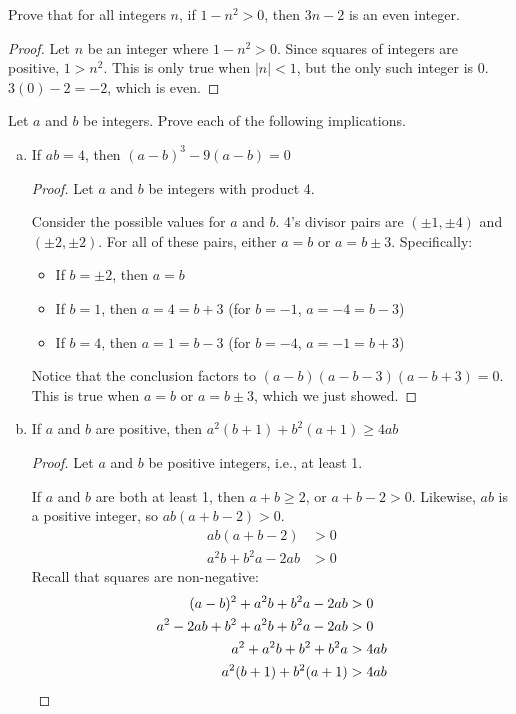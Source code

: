 \question Prove that for all integers $n$, if $1-n^2 > 0$, then $3n - 2$ is an even integer.
\begin{proof}
  Let $n$ be an integer where $1-n^2 > 0$.
  Since squares of integers are positive, $1 > n^2$.
  This is only true when $|n| < 1$, but the only such integer is 0.
  $3(0)-2=-2$, which is even.
\end{proof}


\question Let $a$ and $b$ be integers. Prove each of the following implications.
\begin{enumerate}[(a)]
  \item If $ab = 4$, then $(a-b)^3 - 9(a-b) = 0$
        \begin{proof}
          Let $a$ and $b$ be integers with product 4.

          Consider the possible values for $a$ and $b$.
          4's divisor pairs are $(\pm 1, \pm 4)$ and $(\pm 2, \pm 2)$.
          For all of these pairs, either $a=b$ or $a=b\pm3$.
          Specifically:
          \begin{itemize}
            \item If $b=\pm2$, then $a=b$
            \item If $b=1$, then $a=4=b+3$ (for $b=-1$, $a=-4=b-3$)
            \item If $b=4$, then $a=1=b-3$ (for $b=-4$, $a=-1=b+3$)
          \end{itemize}

          Notice that the conclusion factors to $(a-b)(a-b-3)(a-b+3)=0$.
          This is true when $a=b$ or $a=b\pm3$, which we just showed.
        \end{proof}
  \item If $a$ and $b$ are positive, then $a^2(b+1) + b^2(a+1) \geq 4ab$
        \begin{proof}
          Let $a$ and $b$ be positive integers, i.e., at least 1.

          If $a$ and $b$ are both at least 1, then $a+b \geq 2$, or $a+b-2>0$.
          Likewise, $ab$ is a positive integer, so $ab(a+b-2) > 0$.
          \begin{align*}
            ab(a+b-2)         & > 0 \\
            a^2b + b^2a - 2ab & > 0
          \end{align*}
          Recall that squares are non-negative:
          \begin{align*}
            (a-b)^2 + a^2b + b^2a - 2ab         & > 0            \\
            a^2 - 2ab + b^2 + a^2b + b^2a - 2ab & > 0            \\
            a^2 + a^2b + b^2 + b^2a             & > 4ab          \\
            a^2(b+1) + b^2(a+1)                 & > 4ab \qedhere
          \end{align*}
        \end{proof}
\end{enumerate}


